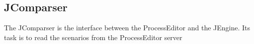 %
%
\subsection{JComparser}
The JComparser is the interface between the ProcessEditor and the JEngine. Its task is to read the scenarios from the ProcessEditor server